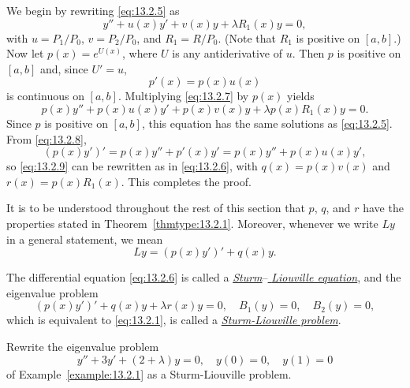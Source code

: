 \proof We begin by rewriting \eqref{eq:13.2.5} as
\begin{equation}
  \label{eq:13.2.7}y''+u(x)y'+v(x)y+\lambda R_{1}(x)y=0,
\end{equation}
with $u=P_{1}/P_{0}$, $v=P_{2}/P_{0}$, and $R_{1}=R/P_{0}$. (Note that $R_{1}$ is positive on
$[a,b]$.) Now let $p(x)=e^{U(x)}$, where $U$ is any antiderivative of $u$. Then $p$ is positive on
$[a,b]$ and, since $U'=u$,
\begin{equation}
  \label{eq:13.2.8}p'(x)=p(x)u(x)
\end{equation}
is continuous on $[a,b]$. Multiplying \eqref{eq:13.2.7} by $p(x)$ yields
\begin{equation}
  \label{eq:13.2.9}p(x)y''+p(x)u(x)y'+p(x)v(x)y+\lambda p(x)R_{1}(x)y=0.
\end{equation}
Since $p$ is positive on $[a,b]$, this equation has the same solutions as \eqref{eq:13.2.5}. From
\eqref{eq:13.2.8},
\[
  (p(x)y')'=p(x)y''+p'(x)y'=p(x)y''+p(x)u(x)y',
\]
so \eqref{eq:13.2.9} can be rewritten as in \eqref{eq:13.2.6}, with $q(x)=p(x)v(x)$ and
$r(x)=p(x)R_{1}(x)$. This completes the proof.

It is to be understood throughout the rest of this section that $p$, $q$, and $r$ have the
properties stated in Theorem~\ref{thmtype:13.2.1}. Moreover, whenever we write $Ly$ in a general
statement, we mean
\[
  Ly=(p(x)y')'+q(x)y.
\]

The differential equation \eqref{eq:13.2.6} is called a
\href{https://mathshistory.st-andrews.ac.uk/Biographies/Sturm/}{\color{blue}
\it Sturm}--\href{https://mathshistory.st-andrews.ac.uk/Biographies/Liouville/}{\color{blue}
\it Liouville equation}, and the eigenvalue problem
\begin{equation}
  \label{eq:13.2.10}(p(x)y')'+q(x)y+\lambda r(x)y=0,\quad B_{1}(y)=0,\quad B_{2}(y)=0,
\end{equation}
which is equivalent to \eqref{eq:13.2.1}, is called a
\href{https://mathshistory.st-andrews.ac.uk/Biographies/Sturm/}{\color{blue}
\it Sturm-Liouville problem}.

\begin{example}
  \label{example:13.2.3} \rm Rewrite the eigenvalue problem
  \begin{equation}
    \label{eq:13.2.11}y''+3y'+(2+\lambda)y=0,\quad y(0)=0,\quad y(1)=0
  \end{equation}
  of Example~\ref{example:13.2.1} as a Sturm-Liouville problem.
\end{example}

